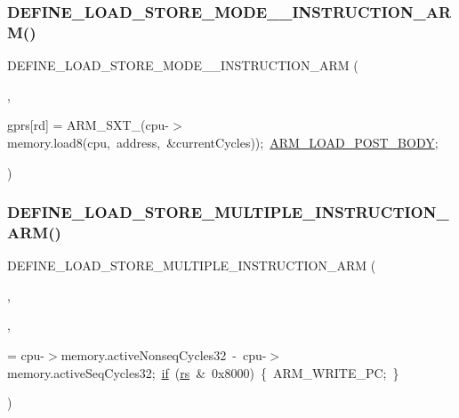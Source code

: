\subsubsection{\texorpdfstring{D\+E\+F\+I\+N\+E\+\_\+\+L\+O\+A\+D\+\_\+\+S\+T\+O\+R\+E\+\_\+\+M\+O\+D\+E\+\_\+\_\+\+I\+N\+S\+T\+R\+U\+C\+T\+I\+O\+N\+\_\+\+A\+R\+M()}{DEFINE\_LOAD\_STORE\_MODE\_3\_INSTRUCTION\_ARM()}}
{\footnotesize\ttfamily D\+E\+F\+I\+N\+E\+\_\+\+L\+O\+A\+D\+\_\+\+S\+T\+O\+R\+E\+\_\+\+M\+O\+D\+E\+\_\+\_\+\+I\+N\+S\+T\+R\+U\+C\+T\+I\+O\+N\+\_\+\+A\+RM (\begin{DoxyParamCaption}\item[{L\+D\+R\+SB}]{,  }\item[{cpu-\/$>$}]{gprs\mbox{[}rd\mbox{]} = {\ttfamily ARM\+\_\+SXT\+\_(cpu-\/$>$memory.load8(cpu,~address,~\&currentCycles));~\mbox{\hyperlink{isa-arm_8c_a4131d10dd974fc82650f1680b46fec77}{A\+R\+M\+\_\+\+L\+O\+A\+D\+\_\+\+P\+O\+S\+T\+\_\+\+B\+O\+DY}};} }\end{DoxyParamCaption})}

\mbox{\label{isa-arm_8c_a4a7fb780e97a1239869fd7d1f7d69821}} 
\subsubsection{\texorpdfstring{D\+E\+F\+I\+N\+E\+\_\+\+L\+O\+A\+D\+\_\+\+S\+T\+O\+R\+E\+\_\+\+M\+U\+L\+T\+I\+P\+L\+E\+\_\+\+I\+N\+S\+T\+R\+U\+C\+T\+I\+O\+N\+\_\+\+A\+R\+M()}{DEFINE\_LOAD\_STORE\_MULTIPLE\_INSTRUCTION\_ARM()}}
{\footnotesize\ttfamily D\+E\+F\+I\+N\+E\+\_\+\+L\+O\+A\+D\+\_\+\+S\+T\+O\+R\+E\+\_\+\+M\+U\+L\+T\+I\+P\+L\+E\+\_\+\+I\+N\+S\+T\+R\+U\+C\+T\+I\+O\+N\+\_\+\+A\+RM (\begin{DoxyParamCaption}\item[{L\+DM}]{,  }\item[{\mbox{\hyperlink{pufftest_8c_a6e4d4615cece3375ac8c7b94a1ade4fa}{load}}}]{,  }\item[{current\+Cycles+}]{ = {\ttfamily cpu-\/$>$memory.activeNonseqCycles32~-\/~cpu-\/$>$memory.activeSeqCycles32;~\mbox{\hyperlink{isa-lr35902_8c_a2eb27369cb3dbac14564f95cd51effdf}{if}}~(\mbox{\hyperlink{isa-thumb_8c_a03b78d51ad860bbea2f9c98276d0b70b}{rs}}~\&~0x8000)~\{~ARM\+\_\+WRITE\+\_\+PC;~\}} }\end{DoxyParamCaption})}

